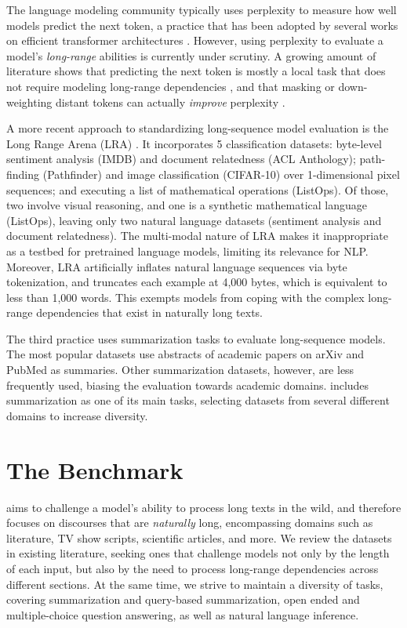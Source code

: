 The language modeling community typically uses perplexity to measure how well models predict the next token, a practice that has been adopted by several works on efficient transformer architectures \cite{roy-etal-2021-efficient, choromanski2020rethinking, tay2020synthesizer, peng2021random}. However, using perplexity to evaluate a model's \textit{long-range} abilities is currently under scrutiny. A growing amount of literature shows that predicting the next token is mostly a local task that does not require modeling long-range dependencies \cite{khandelwal-etal-2018-sharp, sun-etal-2021-long}, and that masking or down-weighting distant tokens can actually \textit{improve} perplexity \cite{press-etal-2021-shortformer, press2021train}.

A more recent approach to standardizing long-sequence model evaluation is the Long Range Arena (LRA) \cite{tay2021long}. It incorporates 5 classification datasets: byte-level sentiment analysis (IMDB) and document relatedness (ACL Anthology); path-finding (Pathfinder) and image classification (CIFAR-10) over 1-dimensional pixel sequences; and executing a list of mathematical operations (ListOps). Of those, two involve visual reasoning, and one is a synthetic mathematical language (ListOps), leaving only two natural language datasets (sentiment analysis and document relatedness). The multi-modal nature of LRA makes it inappropriate as a testbed for pretrained language models, limiting its relevance for NLP. Moreover, LRA artificially inflates natural language sequences via byte tokenization, and truncates each example at 4,000 bytes, which is equivalent to less than 1,000 words. This exempts models from coping with the complex long-range dependencies that exist in naturally long texts.

The third practice uses summarization tasks to evaluate long-sequence models. The most popular datasets use abstracts of academic papers on arXiv and PubMed \cite{cohan-etal-2018-discourse} as summaries. Other summarization datasets, however, are less frequently used, biasing the evaluation towards academic domains.
\scrolls{} includes summarization as one of its main tasks, selecting datasets from several different domains to increase diversity.

\section{The \scrolls{} Benchmark}

\scrolls{} aims to challenge a model's ability to process long texts in the wild, and therefore focuses on discourses that are \textit{naturally} long, encompassing domains such as literature, TV show scripts, scientific articles, and more. We review the datasets in existing literature, seeking ones that challenge models not only by the length of each input, but also by the need to process long-range dependencies across different sections. At the same time, we strive to maintain a diversity of tasks, covering summarization and query-based summarization, open ended and multiple-choice question answering, as well as natural language inference.

